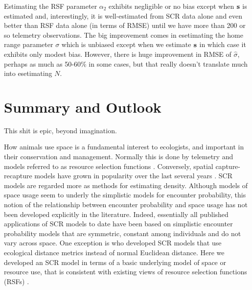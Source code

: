 Estimating the RSF parameter $\alpha_{2}$ exhibits negligible or no
bias except when ${\bf s}$ is estimated and, interestingly, it is
well-estimated from SCR data alone and even better than RSF data alone
(in terms of RMSE) until we have more than 200 or so telemetry
observations.  The big improvement comes in esetimating the home range
parameter $\sigma$ which is unbiased except when we estimate ${\bf s}$
in which case it exhibits only modest bias.  However, there is huge
improvement in RMSE of $\hat{\sigma}$, perhaps as much as 50-60\% in
some cases, but that really doesn't translate much into esetimating
$N$.



\section{Summary and Outlook}

This shit is epic, beyond imagination.


How animals use space is a fundamental interest to ecologists, and
important in their conservation and management. Normally this is done
by telemetry and models referred to as resource selection functions
\citep{manly_etal:2002}.  Conversely, spatial capture-recapture models
have grown in popularity over the last several years
\citep{efford:2004,borchers_efford:2008, royle:2008, efford_etal:2009ecol,royle_etal:2009ecol,
  gardner_etal:2010, gardner_etal:2011, kery_etal:2010,
sollmann_etal:2011,mollet_etal:2012,gopalaswmany_etal:2012}. 
  SCR models are regarded
more as methods for estimating density. Although models of space usage
seem to underly the simplistic models for encounter probability, this
notion of the relationship between encounter probability and space
usage has not been developed explicitly in the literature.  Indeed,
essentially all published applications of SCR models to date have been
based on simplistic encounter probability models that are symmetric,
constant among individuals and do not vary across space. One exception
is \citet{royle_etal:2012ecol} who developed SCR models that use
ecological distance metrics instead of normal Euclidean distance. Here
we developed an SCR model in terms of a basic underlying model of
space or resource use, that is consistent with existing views of
resource selection functions (RSFs) \citep{manly_etal:2002}.

